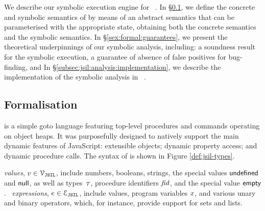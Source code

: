 
We describe our symbolic execution engine for \jsil~\cite{javert}. 
In \S\ref{subsec:jsil:analysis:formalism}, we define the concrete 
and symbolic semantics of \jsil by means of an 
abstract semantics that can be parameterised with the appropriate state, 
obtaining both the concrete semantics and the symbolic semantics.
In \S\ref{sex:formal:guarantees}, we present the theoretical underpinnings of 
our symbolic analysis, including:  a soundness result for the symbolic 
execution,  a guarantee of absence of false positives for bug-finding, 
and   
In \S\ref{subsec:jsil:analysis:implementation}, we describe the implementation 
of the \jsil symbolic analysis in \rosette~\cite{Rosette1,Rosette2}.

\subsection{Formalisation}\label{subsec:jsil:analysis:formalism}

\vspace*{-0.2cm}
 \jsil is a simple goto language featuring top-level procedures and commands operating on object heaps. It was purposefully designed to natively support the main dynamic features of JavaScript: extensible objects; dynamic property access; and dynamic procedure calls. The syntax of \jsil is shown in Figure \ref{def:jsil-types}.

\jsil \emph{values}, $v \in \mathcal{V}_{\mathtt{JSIL}}$, include numbers, booleans, strings, the special values ${\sf undefined}$ and ${\sf null}$, as well as types~$\tau$, procedure identifiers $\mathit{fid}$, and the special value ${\sf empty}$. 
\jsil~\emph{expressions}, $e \in \mathcal{E}_{\mathtt{JSIL}}$, include \jsil values, \jsil program variables $x$, and various unary and binary operators, which, for instance, provide support for sets and lists. 



